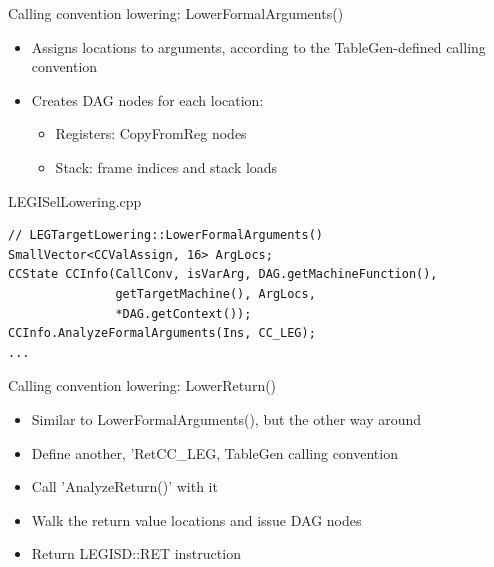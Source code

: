 
\begin{frame}[fragile]{Calling convention lowering: LowerFormalArguments()}

\begin{itemize}
    \item Assigns locations to arguments, according to the TableGen-defined calling convention
    \item Creates DAG nodes for each location:
    \begin{itemize}
        \item Registers: CopyFromReg nodes
        \item Stack: frame indices and stack loads
    \end{itemize}
\end{itemize}

\begin{block}{LEGISelLowering.cpp}
\begin{lstlisting}
// LEGTargetLowering::LowerFormalArguments()
SmallVector<CCValAssign, 16> ArgLocs;
CCState CCInfo(CallConv, isVarArg, DAG.getMachineFunction(),
               getTargetMachine(), ArgLocs,
               *DAG.getContext());
CCInfo.AnalyzeFormalArguments(Ins, CC_LEG);
...
\end{lstlisting}
\end{block}

\end{frame}


\begin{frame}{Calling convention lowering: LowerReturn()}

\begin{itemize}
    \item Similar to LowerFormalArguments(), but the other way around
    \item Define another, 'RetCC\_LEG, TableGen calling convention
    \item Call 'AnalyzeReturn()' with it
    \item Walk the return value locations and issue DAG nodes
    \item Return LEGISD::RET instruction
\end{itemize}

\end{frame}


